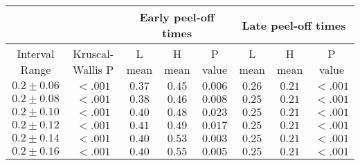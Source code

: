 \documentclass[11pt, oneside]{article}   	%
\begin{document}
\begin{table}[t]
\renewcommand{\arraystretch}{1.5}
\centering
\begin{tabular}[c]{| c | c | c | c | c| c | c | c|}
\hline
& & \multicolumn{3}{|c|}{Early peel-off times} & \multicolumn{3}{|c|}{Late peel-off times} \\
\hline
\textrm{Interval Range} & \textrm{Kruscal-Wallis P} & \textrm{ L mean} & \textrm{H mean} & \textrm{P value} & \textrm{ L mean} & \textrm{H mean} & \textrm{P value} \\
\hline
$0.2 \pm 0.06$ & $<.001 $ & $ 0.37$ & $ 0.45$ & $ 0.006$ & $ 0.26$ & $ 0.21$ & $ < .001$\\
$0.2 \pm 0.08$ & $ < .001	 $ & $ 0.38$ & $ 0.46$ & $ 0.008$ & $ 0.25$ & $ 0.21$ & $ < .001$\\

$0.2 \pm 0.10$ & $ < .001 $ & $ 0.40$ & $ 0.48$ & $ 0.023$ & $ 0.25$ & $ 0.21$ & $ < .001$\\

$0.2 \pm 0.12$ & $ < .001 $ & $ 0.41$ & $ 0.49$ & $ 0.017$ & $ 0.25$ & $ 0.21$ & $ < .001$\\

$0.2 \pm 0.14$ & $ < .001 $ & $ 0.40$ & $ 0.53$ & $ 0.003$ & $ 0.25$ & $ 0.21$ & $ < .001$\\

$0.2 \pm 0.16$ & $ < .001 $ & $ 0.40$ & $ 0.55$ & $ 0.005$ & $ 0.25$ & $ 0.21$ & $ < .001$\\
\hline
\end{tabular}
\label{tab:robustness}
\end{table}
\end{document}
